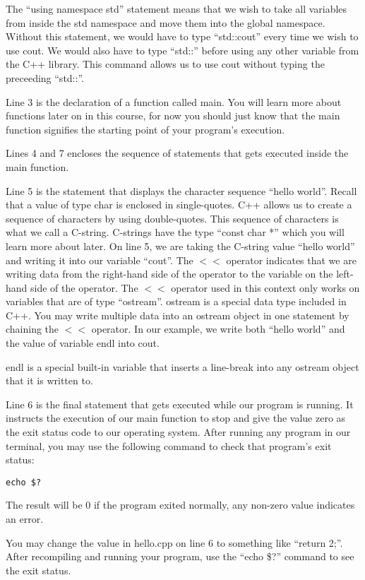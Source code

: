 \documentclass[a4paper,12pt]{article}
\begin{document}
The ``using namespace std'' statement means that we wish to take all variables from inside the std namespace and move them into the global namespace. Without this statement, we would have to type ``std::cout'' every time we wish to use cout. We would also have to type ``std::'' before using any other variable from the C++ library. This command allows us to use cout without typing the preceeding ``std::''.

Line 3 is the declaration of a function called main. You will learn more about functions later on in this course, for now you should just know that the main function signifies the starting point of your program's execution. 

Lines 4 and 7 encloses the sequence of statements that gets executed inside the main function.

Line 5 is the statement that displays the character sequence ``hello world''. Recall that a value of type char is enclosed in single-quotes. C++ allows us to create a sequence of characters by using double-quotes. This sequence of characters is what we call a C-string. C-strings have the type ``const char *'' which you will learn more about later. On line 5, we are taking the C-string value ``hello world'' and writing it into our variable ``cout''. The $<<$ operator indicates that we are writing data from the right-hand side of the operator to the variable on the left-hand side of the operator. The $<<$ operator used in this context only works on variables that are of type ``ostream''. ostream is a special data type included in C++. You may write multiple data into an ostream object in one statement by chaining the $<<$ operator. In our example, we write both ``hello world'' and the value of variable endl into cout. 

endl is a special built-in variable that inserts a line-break into any ostream object that it is written to.

Line 6 is the final statement that gets executed while our program is running. It instructs the execution of our main function to stop and give the value zero as the exit status code to our operating system. After running any program in our terminal, you may use the following command to check that program's exit status:

\lstset{numbers=none}
\begin{lstlisting}
echo $?
\end{lstlisting}

The result will be 0 if the program exited normally, any non-zero value indicates an error.

You may change the value in hello.cpp on line 6 to something like ``return 2;''. After recompiling and running your program, use the ``echo \$?'' command to see the exit status.
\end{document}
